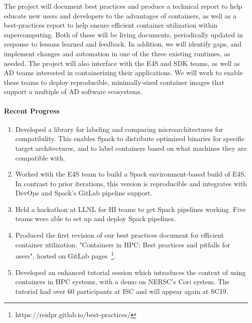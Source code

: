 The project will document best practices and produce a technical report
to help educate new users and developers to the advantages of containers,
as well as a best-practices report to help ensure efficient container
utilization within supercomputing. Both of these will be living
documents, periodically updated in response to lessons learned and
feedback.  In addition, we will identify gaps, and implement changes and
automation in one of the three existing runtimes, as needed.  The project
will also interface with the E4S and SDK teams, as well as AD teams
interested in containerizing their applications. We will work to enable
these teams to deploy reproducible, minimally-sized container images that
support a multiple of AD software ecosystems.

\paragraph{Recent Progress}

\begin{enumerate}
\item Developed a library for labeling and comparing microarchitectures for
      compatibility. This enables Spack to distribute optimized binaries for
      specific target architectures, and to label containers based on what
      machines they are compatible with.

\item Worked with the E4S team to build a Spack environment-based build of
      E4S. In contrast to prior iterations, this version is reproducible
      and integrates with DevOps and Spack's GitLab pipeline support.

\item Held a hackathon at LLNL for HI teams to get Spack pipelines working.
      Five teams were able to set up and deploy Spack pipelines.

\item Produced the first revision of our best practices document for
      efficient container utilization: "Containers in HPC: Best practices
      and pitfalls for users", hosted on
      GitLab pages~\footnote{https://reidpr.gitlab.io/best-practices/}.

\item Developed an enhanced tutorial session which introduces the context
      of using containers in HPC systems, with a demo on NERSC's Cori system.
      The tutorial had over 60 participants at ISC and will appear again at
      SC19.
\end{enumerate}

